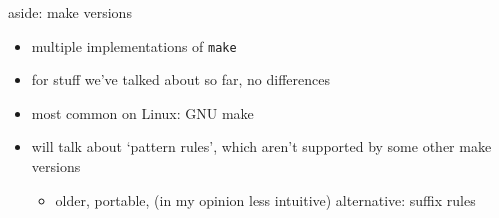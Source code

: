 \begin{frame}{aside: make versions}
    \begin{itemize}
    \item multiple implementations of \texttt{make}
    \item for stuff we've talked about so far, no differences
    \vspace{.5cm}
    \item most common on Linux: GNU make
    \item will talk about `pattern rules', which aren't supported by some other make versions
	\begin{itemize}
	\item older, portable, (in my opinion less intuitive) alternative: suffix rules
	\end{itemize}
    \end{itemize}
\end{frame}
